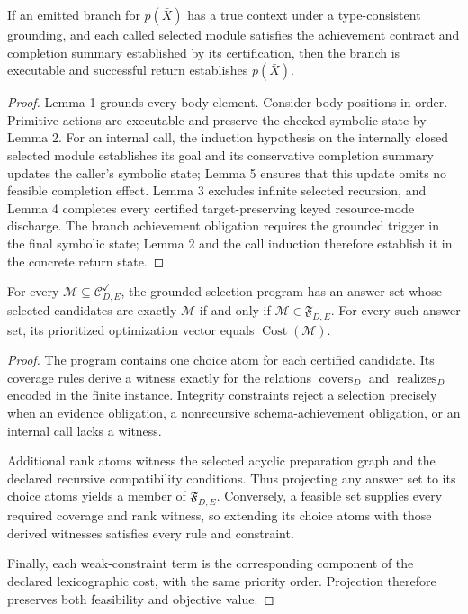 \begin{proposition}
If an emitted branch for $p(\bar X)$ has a true context under a type-consistent
grounding, and each called selected module satisfies the achievement contract
and completion summary established by its certification, then the
branch is executable and successful return establishes $p(\bar X)$.
\end{proposition}

\begin{proof}
Lemma 1 grounds every body element. Consider body positions in order. Primitive
actions are executable and preserve the checked symbolic state by Lemma 2.
For an internal call, the induction hypothesis on the internally closed selected
module
establishes its goal and its conservative completion summary updates the caller's
symbolic state; Lemma 5 ensures that this update omits no feasible completion
effect. Lemma 3 excludes infinite selected recursion, and Lemma 4
completes every certified target-preserving keyed resource-mode discharge. The
branch achievement obligation requires
the grounded trigger in the final symbolic state; Lemma 2 and the call induction
therefore establish it in the concrete return state.
\end{proof}

\begin{lemma}
For every $\mathcal M\subseteq\mathcal C^{\checkmark}_{D,E}$, the grounded
selection program has an answer set whose selected candidates are exactly
$\mathcal M$ if and only if $\mathcal M\in\mathfrak F_{D,E}$. For every such
answer set, its prioritized optimization vector equals
$\operatorname{Cost}(\mathcal M)$.
\end{lemma}

\begin{proof}
The program contains one choice atom for each certified candidate. Its coverage
rules derive a witness exactly for the relations $\operatorname{covers}_D$ and
$\operatorname{realizes}_D$ encoded in the finite instance. Integrity
constraints reject a selection precisely when an evidence obligation, a
nonrecursive schema-achievement obligation, or an internal call lacks a
witness.

Additional rank atoms witness the selected acyclic preparation graph and the
declared recursive compatibility conditions. Thus projecting any answer set to
its choice atoms yields a member of $\mathfrak F_{D,E}$. Conversely, a feasible
set supplies every required coverage and rank witness, so extending its choice
atoms with those derived witnesses satisfies every rule and constraint.

Finally, each weak-constraint term is the corresponding component of the
declared lexicographic cost, with the same priority order. Projection therefore
preserves both feasibility and objective value.
\end{proof}

